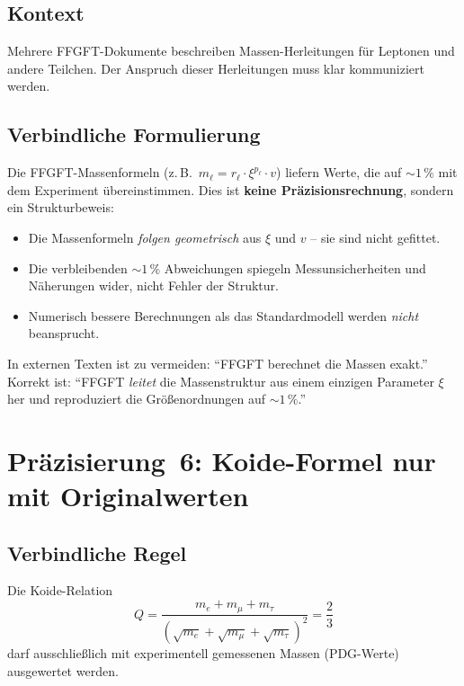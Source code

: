 \subsection*{Kontext}

Mehrere FFGFT-Dokumente beschreiben Massen-Herleitungen für Leptonen
und andere Teilchen. Der Anspruch dieser Herleitungen muss klar
kommuniziert werden.

\subsection*{Verbindliche Formulierung}

Die FFGFT-Massenformeln (z.\,B.\ $m_\ell = r_\ell \cdot \xi^{p_\ell} \cdot v$)
liefern Werte, die auf $\sim 1\,\%$ mit dem Experiment übereinstimmen.
Dies ist \textbf{keine Präzisionsrechnung}, sondern ein Strukturbeweis:

\begin{itemize}
  \item Die Massenformeln \emph{folgen geometrisch} aus $\xi$ und $v$
    -- sie sind nicht gefittet.
  \item Die verbleibenden $\sim 1\,\%$ Abweichungen spiegeln
    Messunsicherheiten und Näherungen wider, nicht Fehler der Struktur.
  \item Numerisch bessere Berechnungen als das Standardmodell werden
    \emph{nicht} beansprucht.
\end{itemize}

In externen Texten ist zu vermeiden: \enquote{FFGFT berechnet die Massen exakt.}
Korrekt ist: \enquote{FFGFT \emph{leitet} die Massenstruktur aus einem einzigen
Parameter $\xi$ her und reproduziert die Größenordnungen auf $\sim 1\,\%$.}

\section{Präzisierung~6: Koide-Formel nur mit Originalwerten}

\subsection*{Verbindliche Regel}

Die Koide-Relation
\begin{equation}
  Q = \frac{m_e + m_\mu + m_\tau}{(\sqrt{m_e}+\sqrt{m_\mu}+\sqrt{m_\tau})^2} = \frac{2}{3}
  \tag{190.11}
\end{equation}
darf ausschließlich mit experimentell gemessenen Massen (PDG-Werte) ausgewertet werden.

